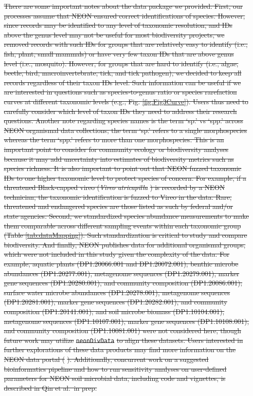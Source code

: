 \documentclass[
  12pt,
]{article}
\providecommand{\DIFdeltex}[1]{{\protect\color{red}\sout{#1}}}                      %
\providecommand{\DIFdelbegin}{} %
\providecommand{\DIFdel}[1]{\texorpdfstring{\DIFdeltex{#1}}{}} %
\newcommand{\DIFscaledelfig}{0.5}
\newlength{\DIFdelgraphicswidth} %
\newlength{\DIFdelgraphicsheight} %
\newcommand{\DIFdelincludegraphics}[2][]{%
\sbox{\DIFdelgraphicsbox}{\DIFOincludegraphics[#1]{#2}}%
\settoboxwidth{\DIFdelgraphicswidth}{\DIFdelgraphicsbox} %
\settoboxtotalheight{\DIFdelgraphicsheight}{\DIFdelgraphicsbox} %
\scalebox{\DIFscaledelfig}{%
\parbox[b]{\DIFdelgraphicswidth}{\usebox{\DIFdelgraphicsbox}\\[-\baselineskip] \rule{\DIFdelgraphicswidth}{0em}}\llap{\resizebox{\DIFdelgraphicswidth}{\DIFdelgraphicsheight}{%
\setlength{\unitlength}{\DIFdelgraphicswidth}%
\begin{picture}(1,1)%
\thicklines\linethickness{2pt} %
{\color[rgb]{1,0,0}\put(0,0){\framebox(1,1){}}}%
{\color[rgb]{1,0,0}\put(0,0){\line( 1,1){1}}}%
{\color[rgb]{1,0,0}\put(0,1){\line(1,-1){1}}}%
\end{picture}%
}\hspace*{3pt}}} %
} %
\DeclareRobustCommand{\DIFdelbegin}{\DIFOdelbegin \let\includegraphics\DIFdelincludegraphics} %
\begin{document}
\DIFdelbegin \DIFdel{There are some important notes about the data package we provided. First, our processes assume that NEON ensured correct identifications of species. However, since records may be identified to any level of taxonomic resolution, and IDs above the genus level may not be useful for most biodiversity projects, we removed records with such IDs for groups that are relatively easy to identify (i.e., fish, plant, small mammals) or have very few taxon IDs that are above genus level (i.e., mosquito). However, for groups that are hard to identify (i.e., algae, beetle, bird, macroinvertebrate, tick, and tick pathogen), we decided to keep all records regardless of their taxon IDs level. Such information can be useful if we are interested in questions such as species-to-genus ratio or species rarefaction curves at different taxonomic levels (e.g., Fig. \ref{fig:Fig3Curve}). Users thus need to carefully consider which level of taxon IDs they need to address their research questions. Another note regarding species names is the term `sp.' vs `spp.' across NEON organismal data collections; the term `sp.' refers to a single morphospecies whereas the term `spp.' refers to more than one morphospecies. This is an important point to consider for community ecology or biodiversity analyses because it may add uncertainty into estimates of biodiversity metrics such as species richness. It is also important to point out that NEON fuzzed taxonomic IDs to one higher taxonomic level to protect species of concern. For example, if a threatened Black-capped vireo (}\emph{\DIFdel{Vireo atricapilla}}%
\DIFdel{) is recorded by a NEON technician, the taxonomic identification is fuzzed to Vireo in the data. Rare, threatened and endangered species are those listed as such by federal and/or state agencies. Second, we standardized species abundance measurements to make them comparable across different sampling events within each taxonomic group (Table \ref{tab:dataMapping}). Such standardization is critical to study and compare biodiversity. And finally, NEON publishes data for additional organismal groups, which were not included in this study given the complexity of the data. For example, aquatic plants (DP1.20066.001 and DP1.20072.001); benthic microbe abundances (DP1.20277.001), metagenome sequences (DP1.20279.001), marker gene sequences (DP1.20280.001), and community composition (DP1.20086.001); surface water microbe abundances (DP1.20278.001), metagenome sequences (DP1.20281.001), marker gene sequences (DP1.20282.001), and community composition (DP1.20141.001); and soil microbe biomass (DP1.10104.001), metagenome sequences (DP1.10107.001), marker gene sequences (DP1.10108.001), and community composition (DP1.10081.001) were not considered here, though future work may utilize }\texttt{\DIFdel{neonDivData}} %
\DIFdel{to align these datasets. Users interested in further explorations of these data products may find more information on the NEON data portal (}%
\DIFdel{). Additionally, concurrent work on a suggested bioinformatics pipeline and how to run sensitivity analyses on user-defined parameters for NEON soil microbial data, including code and vignettes, is described in Qin et al.~in prep.
}%
\end{document}

